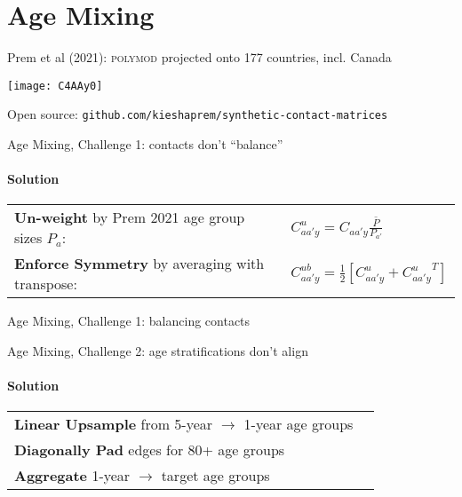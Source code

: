 \section{Age Mixing}
\begin{frame}{Prem et al (2021): \textsc{polymod} projected onto 177 countries, incl. Canada}
  \centerline{\texttt{[image: C4AAy0]}}
  \bigpar
  Open source: \texttt{github.com/kieshaprem/synthetic-contact-matrices}
\end{frame}
\begin{frame}{Age Mixing, Challenge 1: contacts don't ``balance''}
  \paragraph{Solution}
  \bigpar
  \begin{tabular}{ll}
    \textbf{Un-weight} by Prem 2021 age group sizes $P_a$: &
    $C^u_{aa'y} = C_{aa'y} \frac{\bar{P}}{P_{a'}}$
    \\[\eqtabsep]
    \textbf{Enforce Symmetry} by averaging with transpose: &
    $C^{ub}_{aa'y} = \frac{1}{2}\left[C^u_{aa'y} + {C^u_{aa'y}}^T\right]$
  \end{tabular}
\end{frame}
\begin{frame}{Age Mixing, Challenge 1: balancing contacts}
  \centering
\end{frame}
\begin{frame}{Age Mixing, Challenge 2: age stratifications don't align}
  \paragraph{Solution}
  \bigpar
  \begin{tabular}{ll}
    \textbf{Linear Upsample} from 5-year $\rightarrow$ 1-year age groups & \\[\eqtabsep]
    \textbf{Diagonally Pad} edges for 80+ age groups & \\[\eqtabsep]
    \textbf{Aggregate} 1-year $\rightarrow$ target age groups & \\[\eqtabsep]
  \end{tabular}
\end{frame}
